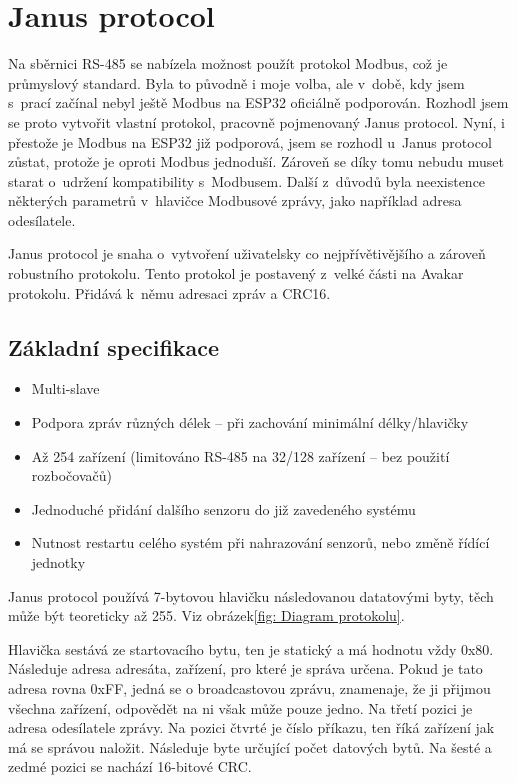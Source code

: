 \chapter{Janus protocol}
Na sběrnici RS-485 se nabízela možnost použít protokol Modbus\cite{modbus}, což je průmyslový standard.
Byla to původně i moje volba, ale v~době, kdy jsem s~prací začínal nebyl ještě Modbus na ESP32 oficiálně podporován.
Rozhodl jsem se proto vytvořit vlastní protokol, pracovně pojmenovaný Janus protocol.
Nyní, i přestože je Modbus na ESP32 již podporová, jsem se rozhodl u~Janus protocol zůstat, protože je oproti Modbus jednoduší.
Zároveň se díky tomu nebudu muset starat o~udržení kompatibility s~Modbusem.
Další z~důvodů byla neexistence některých parametrů v~hlavičce Modbusové zprávy, jako například adresa odesílatele. 

Janus protocol je snaha o~vytvoření uživatelsky co nejpřívětivějšího a zároveň robustního protokolu.
Tento protokol je postavený z~velké části na Avakar protokolu.
Přidává k~němu adresaci zpráv a CRC16.


\section{Základní specifikace}
\begin{itemize}
    \item Multi-slave
    \item Podpora zpráv různých délek -- při zachování minimální délky/hlavičky
    \item Až 254 zařízení (limitováno RS-485 na 32/128 zařízení -- bez použití rozbočovačů)
    \item Jednoduché přidání dalšího senzoru do již zavedeného systému
    \item Nutnost restartu celého systém při nahrazování senzorů, nebo změně řídící jednotky
\end{itemize}

Janus protocol používá 7-bytovou hlavičku následovanou datatovými byty, těch může být teoreticky až 255.
Viz obrázek\ref{fig: Diagram protokolu}.

Hlavička sestává ze startovacího bytu, ten je statický a má hodnotu vždy 0x80.
Následuje adresa adresáta, zařízení, pro které je správa určena.
Pokud je tato adresa rovna 0xFF, jedná se o broadcastovou zprávu, znamenaje, že ji přijmou všechna zařízení, odpovědět na ni však může pouze jedno.
Na třetí pozici je adresa odesílatele zprávy.
Na pozici čtvrté je číslo příkazu, ten říká zařízení jak má se správou naložit.
Následuje byte určující počet datových bytů.
Na šesté a zedmé pozici se nachází 16-bitové CRC.

